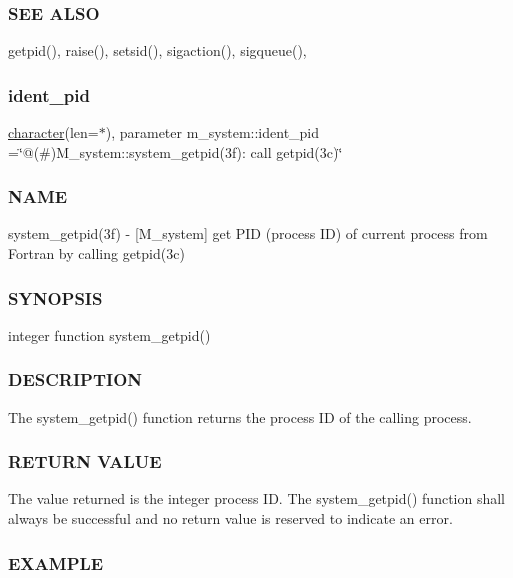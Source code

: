 \subsubsection*{S\+EE A\+L\+SO}

getpid(), raise(), setsid(), sigaction(), sigqueue(), \mbox{\label{namespacem__system_a6f5d3dc2ba4ac439e0ba6b428918f956}} 
\subsubsection{\texorpdfstring{ident\+\_\+pid}{ident\_pid}}
{\footnotesize\ttfamily \hyperlink{option__stopwatch_83_8txt_abd4b21fbbd175834027b5224bfe97e66}{character}(len=$\ast$), parameter m\+\_\+system\+::ident\+\_\+pid =\char`\"{}@(\#)M\+\_\+system\+::system\+\_\+getpid(3f)\+: call getpid(3c)\char`\"{}\hspace{0.3cm}{\ttfamily [private]}}



\subsubsection*{N\+A\+ME}

system\+\_\+getpid(3f) -\/ \mbox{[}M\+\_\+system\mbox{]} get P\+ID (process ID) of current process from Fortran by calling getpid(3c) \subsubsection*{S\+Y\+N\+O\+P\+S\+IS}

integer function system\+\_\+getpid() \subsubsection*{D\+E\+S\+C\+R\+I\+P\+T\+I\+ON}

The system\+\_\+getpid() function returns the process ID of the calling process. \subsubsection*{R\+E\+T\+U\+RN V\+A\+L\+UE}

The value returned is the integer process ID. The system\+\_\+getpid() function shall always be successful and no return value is reserved to indicate an error. \subsubsection*{E\+X\+A\+M\+P\+LE}

